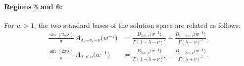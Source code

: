 \documentclass[11pt]{article}
\makeatletter
\newcommand*{\wideboxed}[1]{\setlength{\fboxsep}{1ex}%
  \fbox{\m@th$\displaystyle#1$}}
\newcommand*{\bra}[1]{\langle{#1}|}
\newcommand*{\ket}[1]{|{#1}\rangle}
\DeclareMathOperator{\Tr}{Tr}
\newcommand{\IN}{\text{in}}
\newcommand{\OUT}{\text{out}}
\makeatother
\begin{document}
\paragraph{Regions 5 and 6:} For $w>1$, the two standard bases of the solution space are related as follows:
\begin{equation}
\begin{aligned} \label{ABtrans56}
\frac{\sin(2\pi\lambda)}{\pi}\,A_{\lambda,-\nu,-\nu}\big(w^{-1}\big)
&=\frac{B_{\lambda,\nu,\nu}\big(w^{-1}\big)}{\Gamma(1-\lambda-\nu)^2}
-\frac{B_{1-\lambda,\nu,\nu}\big(w^{-1}\big)}{\Gamma(\lambda-\nu)^2},
\\[3pt]
\frac{\sin(2\pi\lambda)}{\pi}\,A_{\lambda,\nu,\nu}\big(w^{-1}\big)
&=\frac{B_{\lambda,\nu,\nu}\big(w^{-1}\big)}{\Gamma(1-\lambda+\nu)^2}
-\frac{B_{1-\lambda,\nu,\nu}\big(w^{-1}\big)}{\Gamma(\lambda+\nu)^2}.
\end{aligned}
\end{equation}
\end{document}
